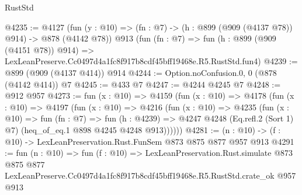\begin{lexlean}{RustStd}
\begin{coremodule}
@4235 := @4127
    (fun (y : @10) => (fn : @7) -> (h : @899 (@909 (@4137 @78)) @914) -> @878 (@4142 @78))
    @913
    (fun (fn : @7) =>
    fun (h : @899 (@909 (@4151 @78)) @914) =>
    LexLeanPreserve.Cc0497d4a1fc8f917b8cdf45bff19468e.R5.RustStd.fun4)
@4239 := @899 (@909 (@4137 @414)) @914
@4244 := Option.noConfusion.{0, 0} (@878 (@4142 @414)) @7
@4245 := @433 @7
@4247 := @4244 @4245 @7
@4248 := @912 @957
@4273 := fun (x : @10) =>
  @4159
    (fun (x : @10) =>
    @4178
      (fun (x : @10) =>
      @4197
        (fun (x : @10) =>
        @4216
          (fun (x : @10) =>
          @4235
            (fun (x : @10) =>
            fun (fn : @7) =>
            fun (h : @4239) =>
            @4247 @4248 (Eq.refl.{2} (Sort 1) @7) (heq_of_eq.{1} @898 @4245 @4248 @913))))))
@4281 := (n : @10) -> (f : @10) -> LexLeanPreservation.Rust.FunSem @873 @875 @877 @957 @913
@4291 := fun (n : @10) =>
  fun (f : @10) =>
  LexLeanPreservation.Rust.simulate
    @873
    @875
    @877
    LexLeanPreserve.Cc0497d4a1fc8f917b8cdf45bff19468e.R5.RustStd.crate_ok
    @957
    @913
\end{coremodule}
\end{lexlean}
